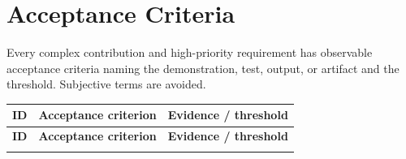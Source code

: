 \documentclass[12pt,a4paper]{article}
\begin{document}
\section{Acceptance Criteria}

Every complex contribution and high-priority requirement has observable acceptance criteria naming the demonstration, test, output, or artifact and the threshold. Subjective terms are avoided.

\begin{center}
\footnotesize
\setlength{\tabcolsep}{4pt}
\renewcommand{\arraystretch}{1.2}
\begin{longtable}{@{}p{2.6cm}p{6.4cm}p{4.2cm}@{}}
\toprule
\textbf{ID} & \textbf{Acceptance criterion} & \textbf{Evidence / threshold} \\
\midrule
\endfirsthead
\toprule
\textbf{ID} & \textbf{Acceptance criterion} & \textbf{Evidence / threshold} \\
\midrule
\endhead
\bottomrule
\endfoot


\end{longtable}
\end{center}
\end{document}
